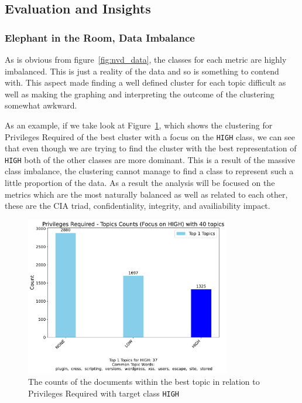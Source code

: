 \documentclass[12pt]{article}
\begin{document}
\subsection{Evaluation and Insights}

\subsubsection*{Elephant in the Room, Data Imbalance}

As is obvious from figure~\ref{fig:nvd_data}, the classes for each metric are highly imbalanced.
This is just a reality of the data and so is something to contend with. This aspect
made finding a well defined cluster for each topic difficult as well as making the graphing and
interpreting the outcome of the clustering somewhat awkward.

As an example, if we take look at Figure~\ref{fig:priviledgesRequired_BAD}, which shows the
clustering for Privileges Required  of the best cluster with a focus on the \texttt{HIGH} class, we
can see that even though we are trying to find the cluster with the best representation of
\texttt{HIGH} both of the other classes are more dominant. This is a result of the massive class
imbalance, the clustering cannot manage to find a class to represent such a little proportion of the
data. As a result the analysis will be focused on the metrics which are the most naturally balanced
as well as related to each other, these are the CIA triad, confidentiality, integrity, and availiability
impact.

\begin{figure}[ht]
	\centering
	\includegraphics[width=0.8\textwidth]{figures/privilegesRequired/merged_top_k_topics_category_focus_counts_privilegesRequired_HIGH_k1.pdf}

	\caption{The counts of the documents within the best topic in relation to Privileges Required with
		target class \texttt{HIGH}}

	\label{fig:priviledgesRequired_BAD}
\end{figure}
\end{document}
